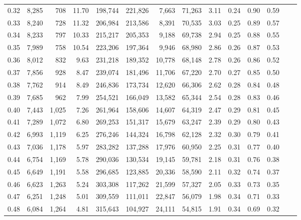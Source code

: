 \begin{tabular}{rrrrrrrrrrrrrr}
0.32 &  8,285 &    708 &   11.70 &  198,744 &  221,826 &   7,663 &  71,263 &  3.11 &  0.24 &  0.90 &      0.59 \\
0.33 &  8,240 &    728 &   11.32 &  206,984 &  213,586 &   8,391 &  70,535 &  3.03 &  0.25 &  0.89 &      0.57 \\
0.34 &  8,233 &    797 &   10.33 &  215,217 &  205,353 &   9,188 &  69,738 &  2.94 &  0.25 &  0.88 &      0.55 \\
0.35 &  7,989 &    758 &   10.54 &  223,206 &  197,364 &   9,946 &  68,980 &  2.86 &  0.26 &  0.87 &      0.53 \\
0.36 &  8,012 &    832 &    9.63 &  231,218 &  189,352 &  10,778 &  68,148 &  2.78 &  0.26 &  0.86 &      0.52 \\
0.37 &  7,856 &    928 &    8.47 &  239,074 &  181,496 &  11,706 &  67,220 &  2.70 &  0.27 &  0.85 &      0.50 \\
0.38 &  7,762 &    914 &    8.49 &  246,836 &  173,734 &  12,620 &  66,306 &  2.62 &  0.28 &  0.84 &      0.48 \\
0.39 &  7,685 &    962 &    7.99 &  254,521 &  166,049 &  13,582 &  65,344 &  2.54 &  0.28 &  0.83 &      0.46 \\
0.40 &  7,443 &  1,025 &    7.26 &  261,964 &  158,606 &  14,607 &  64,319 &  2.47 &  0.29 &  0.81 &      0.45 \\
0.41 &  7,289 &  1,072 &    6.80 &  269,253 &  151,317 &  15,679 &  63,247 &  2.39 &  0.29 &  0.80 &      0.43 \\
0.42 &  6,993 &  1,119 &    6.25 &  276,246 &  144,324 &  16,798 &  62,128 &  2.32 &  0.30 &  0.79 &      0.41 \\
0.43 &  7,036 &  1,178 &    5.97 &  283,282 &  137,288 &  17,976 &  60,950 &  2.25 &  0.31 &  0.77 &      0.40 \\
0.44 &  6,754 &  1,169 &    5.78 &  290,036 &  130,534 &  19,145 &  59,781 &  2.18 &  0.31 &  0.76 &      0.38 \\
0.45 &  6,649 &  1,191 &    5.58 &  296,685 &  123,885 &  20,336 &  58,590 &  2.11 &  0.32 &  0.74 &      0.37 \\
0.46 &  6,623 &  1,263 &    5.24 &  303,308 &  117,262 &  21,599 &  57,327 &  2.05 &  0.33 &  0.73 &      0.35 \\
0.47 &  6,251 &  1,248 &    5.01 &  309,559 &  111,011 &  22,847 &  56,079 &  1.98 &  0.34 &  0.71 &      0.33 \\
0.48 &  6,084 &  1,264 &    4.81 &  315,643 &  104,927 &  24,111 &  54,815 &  1.91 &  0.34 &  0.69 &      0.32 \\

\end{tabular}
